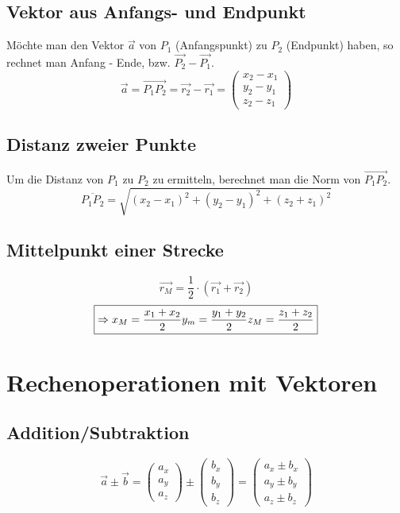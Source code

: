 \subsection{Vektor aus Anfangs- und Endpunkt}
Möchte man den Vektor $\vec{a}$ von $P_1$ (Anfangspunkt) zu $P_2$ (Endpunkt) haben, so rechnet man Anfang - Ende, bzw. $\vec{P_2} - \vec{P_1}$.
\[  \boxed{
    \vec{a} = \overrightarrow{P_1P_2} = \vec{r_2} - \vec{r_1} =
    \left( 
	  \begin{array}{ccc} 
	    x_2 - x_1 \\ y_2 - y_1 \\ z_2 - z_1
	  \end{array}
	\right)
    }
\]

\subsection{Distanz zweier Punkte}
Um die Distanz von $P_1$ zu $P_2$ zu ermitteln, berechnet man die Norm von $\overrightarrow{P_1P_2}$.
\[ \boxed{
   \overline{P_1P_2} = \sqrt{ (x_2 - x_1)^2 + (y_2 - y_1)^2 + (z_2 + z_1)^2 }
   }
\]

\subsection{Mittelpunkt einer Strecke}
\[ \boxed{ \vec{r_M} = \frac{1}{2} \cdot (\vec{r_1} + \vec{r_2}) } \]
\[ \boxed{ \Rightarrow x_M = \frac{x_1 + x_2}{2} \\ y_m = \frac{y_1 + y_2}{2} \\ z_M = \frac{z_1 + z_2}{2} } \]

\section{Rechenoperationen mit Vektoren}

\subsection{Addition/Subtraktion}
\[ \boxed{ \vec{a}\pm\vec{b} =  
    \left( 
	  \begin{array}{ccc} 
	    a_x \\ a_y \\ a_z
	  \end{array}
	\right)
	\pm
	\left( 
	  \begin{array}{ccc} 
	    b_x \\ b_y \\ b_z
	  \end{array}
	\right)
	=
	\left( 
	  \begin{array}{ccc} 
	    a_x \pm b_x \\ a_y \pm b_y \\ a_z \pm b_z
	  \end{array}
	\right)
} \]

